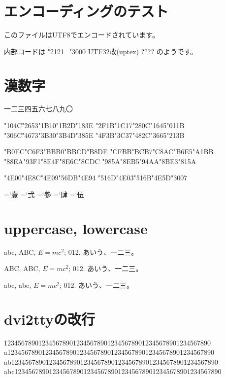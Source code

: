 \documentclass{ujarticle}
\begin{document}
\section{エンコーディングのテスト}
このファイルはUTF8でエンコードされています。

内部コードは
\ifnum\jis"2121="3000
 UTF32改(uptex)%
\else
 ????%
\fi
のようです。


\section{漢数字}

\quad\quad
一二三四五六七八九〇

\char\kuten"104C\char\kuten"2653\char\kuten"1B10\char\kuten"1B2D\char\kuten"183E
\char\kuten"2F1B\char\kuten"1C17\char\kuten"280C\char\kuten"1645\char\kuten"011B
\quad\quad
\char\jis"306C\char\jis"4673\char\jis"3B30\char\jis"3B4D\char\jis"385E
\char\jis"4F3B\char\jis"3C37\char\jis"482C\char\jis"3665\char\jis"213B

\char\euc"B0EC\char\euc"C6F3\char\euc"BBB0\char\euc"BBCD\char\euc"B8DE
\char\euc"CFBB\char\euc"BCB7\char\euc"C8AC\char\euc"B6E5\char\euc"A1BB
\quad\quad
\char\sjis"88EA\char\sjis"93F1\char\sjis"8E4F\char\sjis"8E6C\char\sjis"8CDC
\char\sjis"985A\char\sjis"8EB5\char\sjis"94AA\char\sjis"8BE3\char\sjis"815A

\char\ucs"4E00\char\ucs"4E8C\char\ucs"4E09\char\ucs"56DB\char\ucs"4E94
\char\ucs"516D\char\ucs"4E03\char\ucs"516B\char\ucs"4E5D\char\ucs"3007

=`壹
=`弐
=`參
=`肆
=`伍

\section{uppercase, lowercase}

abc, ABC, $E=mc^2$; 012. あいう、一二三。

\uppercase{abc, ABC, $E=mc^2$; 012. あいう、一二三。}

\lowercase{abc, ABC, $E=mc^2$; 012. あいう、一二三。}

\section{dvi2ttyの改行}
\parindent 0mm

123456789012345678901234567890123456789012345678901234567890\\
a123456789012345678901234567890123456789012345678901234567890\\
ab123456789012345678901234567890123456789012345678901234567890\\
abc123456789012345678901234567890123456789012345678901234567890\\
\end{document}
